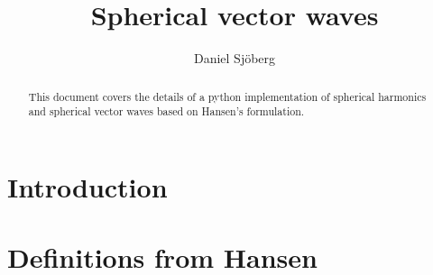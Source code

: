 \documentclass[a4paper,12pt]{article}
\title{Spherical vector waves}
\author{Daniel Sj\"oberg}
\begin{document}
\maketitle

\begin{abstract}
  This document covers the details of a python implementation of
  spherical harmonics and spherical vector waves based on Hansen's
  formulation.
\end{abstract}


\section{Introduction}

\section{Definitions from Hansen \cite{Hansen1988}}
\end{document}
